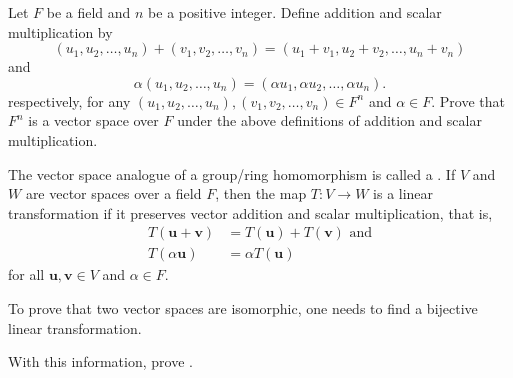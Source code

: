 \begin{problem}
    Let $F$ be a field and $n$ be a positive integer. Define addition and scalar multiplication by
    \[
        (u_1, u_2, \dots, u_n) + (v_1, v_2, \dots, v_n) = (u_1 + v_1, u_2 + v_2, \dots, u_n + v_n)
    \]
    and
    \[
        \alpha(u_1, u_2, \dots, u_n) = (\alpha u_1, \alpha u_2, \dots, \alpha u_n).
    \]
    respectively, for any $(u_1, u_2, \dots, u_n), (v_1, v_2, \dots, v_n) \in F^n$ and $\alpha \in F$. Prove that $F^n$ is a vector space over $F$ under the above definitions of addition and scalar multiplication.
\end{problem}

\begin{problem}\label{problem-vector-space-of-dimension-n-isomorphic-to-F^n}
    The vector space analogue of a group/ring homomorphism is called a . If $V$ and $W$ are vector spaces over a field $F$, then the map $T: V \to W$ is a linear transformation if it preserves vector addition and scalar multiplication, that is,
    \begin{align*}
        T(\textbf{u} + \textbf{v}) &= T(\textbf{u}) + T(\textbf{v}) \text{ and}\\
        T(\alpha\textbf{u}) &= \alpha T(\textbf{u})
    \end{align*}
    for all $\textbf{u}, \textbf{v} \in V$ and $\alpha \in F$.

    To prove that two vector spaces are isomorphic, one needs to find a bijective linear transformation.

    With this information, prove .
\end{problem}
